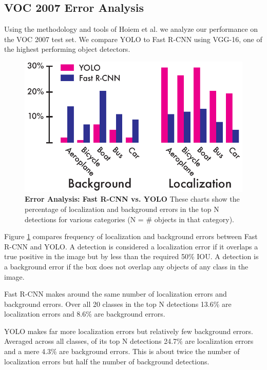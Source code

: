 \documentclass{article} %
\begin{document}
\subsection{VOC 2007 Error Analysis}
\label{error}

Using the methodology and tools of Hoiem et al. \cite{hoiem2012diagnosing} we analyze our performance on the VOC 2007 test set. We compare YOLO to Fast R-CNN using VGG-16, one of the highest performing object detectors.

\begin{figure}
      \centering
        \includegraphics[width=\linewidth]{errors}
      \caption{\textbf{Error Analysis: Fast R-CNN vs. YOLO} These charts show the percentage of localization and background errors in the top N detections for various categories (N = # objects in that category).}
      \label{errors}
   \end{figure}

Figure \ref{errors} compares frequency of localization and background errors between Fast R-CNN and YOLO. A detection is considered a localization error if it overlaps a true positive in the image but by less than the required 50\% IOU. A detection is a background error if the box does not overlap any objects of any class in the image.

Fast R-CNN makes around the same number of localization errors and background errors. Over all 20 classes in the top N detections 13.6\% are localization errors and 8.6\% are background errors.

YOLO makes far more localization errors but relatively few background errors. Averaged across all classes, of its top N detections 24.7\% are localization errors and a mere 4.3\% are background errors. This is about twice the number of localization errors but half the number of background detections.
\end{document}

